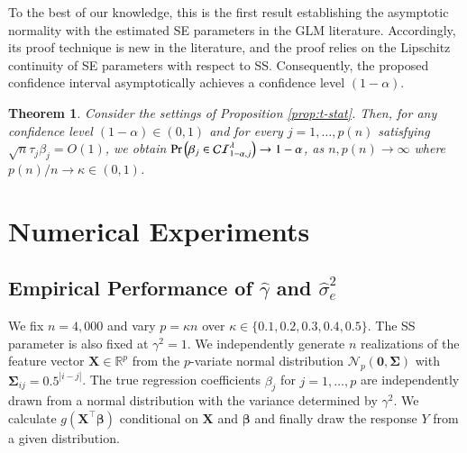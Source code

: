 \documentclass[12pt,reqno]{amsart}
\newtheorem{theorem}{Theorem}
\newcommand{\rbr}[1]{\left(#1\right)}
\newcommand{\R}{\mathbb{R}}
\newcommand{\rc}{\color{black}}
\newcommand{\cc}{\color{black}}
\newcommand{\ccc}{\color{black}}
\renewcommand{\hat}{\widehat}
\def\bzero{\bm{0}}
\def\bX{\bm{X}}
\def\bbeta{\bm{\beta}}
\def\bSigma{\bm{\Sigma}}
\begin{document}
{\rc
To the best of our knowledge, this is the first result establishing the asymptotic normality with the estimated SE parameters in the GLM literature.
{\cc Accordingly, its proof technique is new in the literature, and}
the proof relies on the Lipschitz continuity of SE parameters with respect to SS.
}
Consequently, the proposed confidence interval asymptotically achieves a confidence level $(1-\alpha)$.

\begin{theorem}
\label{thm:conf-intrvl}
    {\cc Consider} the settings of Proposition \ref{prop:t-stat}.  
    Then, for any confidence level $(1-\alpha)\in(0,1)$ and for every $j = 1,\dots,p(n)$ satisfying $\sqrt{n}\tau_j\beta_j=O(1)$, we obtain $\mathrm{Pr}\rbr{\beta_j \in \mathcal{CI}_{{1-\alpha},j}^{\ccc\lambda}}\to1-\alpha$, as $n,p(n)\to\infty$ where $p(n)/n\to\kappa\in(0,1)$.
\end{theorem}


\section{Numerical Experiments}
\label{sec:numerical-exprmnt}
\subsection{Empirical Performance of \texorpdfstring{$\hat{\gamma}$}{gammahat} and \texorpdfstring{$\hat{\sigma}_{e}^2$}{sigma2hat}} \label{sec:exp_empirical}
We fix $n=4,000$ and vary $p=\kappa n$ over $\kappa \in \{0.1,0.2,0.3,0.4,0.5\}$. 
The SS parameter is also fixed at $\gamma^2=1$. We independently generate $n$ realizations of the feature vector $\bX\in\R^p$ from the $p$-variate normal distribution $\mathcal{N}_p(\bzero, \bSigma)$ with $\bSigma_{ij}=0.5^{|i-j|}$. The true regression coefficients $\beta_j$ for $j=1,\ldots,p$ are independently drawn from a normal distribution with the variance determined by $\gamma^2$. 
We calculate $g(\bX^\top\bbeta)$ conditional on $\bX$ and $\bbeta$ and finally draw the response $Y$ from a given distribution. 
\end{document}
